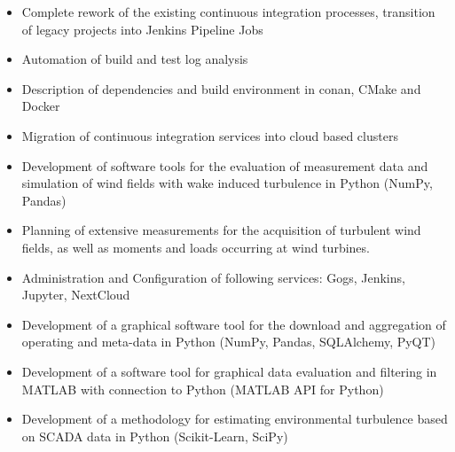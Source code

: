 \documentclass[10pt,a4paper,ragged2e,normalphoto]{altacv}
\begin{document}

  \begin{fullwidth}
    \makecvheader
  \end{fullwidth}

      \begin{itemize}
        \item Complete rework of the existing continuous integration processes, transition of legacy projects into Jenkins Pipeline Jobs \\
        \item Automation of build and test log analysis \\
        \item Description of dependencies and build environment in conan, CMake and Docker \\
        \item Migration of continuous integration services into cloud based clusters \\
      \end{itemize}
    \divider

      \begin{itemize}
        \item Development of software tools for the evaluation of measurement data and simulation of wind fields with wake induced turbulence in Python (NumPy, Pandas) \\
        \item Planning of extensive measurements for the acquisition of turbulent wind fields, as well as moments and loads occurring at wind turbines. \\
        \item Administration and Configuration of following services: Gogs, Jenkins, Jupyter, NextCloud \\
      \end{itemize}
    \divider

      \begin{itemize}
        \item Development of a graphical software tool for the download and aggregation of operating and meta-data in Python (NumPy, Pandas, SQLAlchemy, PyQT) \\
        \item Development of a software tool for graphical data evaluation and filtering in MATLAB with connection to Python (MATLAB API for Python) \\
        \item Development of a methodology for estimating environmental turbulence based on SCADA data in Python (Scikit-Learn, SciPy) \\
      \end{itemize}
\end{document}
